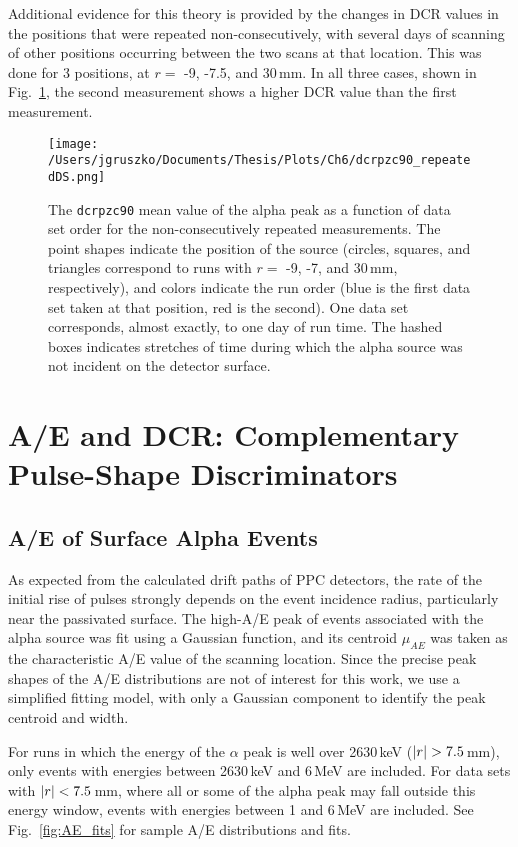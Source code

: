 Additional evidence for this theory is provided by the changes in DCR values in the positions that were repeated non-consecutively, with several days of scanning of other positions occurring between the two scans at that location. This was done for 3 positions, at $r= $  -9, -7.5, and 30\,mm. In all three cases, shown in Fig.~\ref{fig:DCR_repeated}, the second measurement shows a higher DCR value than the first measurement.  

\begin{figure}[t]
 \centering
 \texttt{[image: /Users/jgruszko/Documents/Thesis/Plots/Ch6/dcrpzc90\_repeatedDS.png]}
 \caption[The change in DCR parameter values over time at repeated scan positions] {The {\tt dcrpzc90} mean value of the alpha peak as a function of data set order for the non-consecutively repeated measurements. The point shapes indicate the position of the source (circles, squares, and triangles correspond to runs with $r=$ -9, -7, and 30\,mm, respectively), and colors indicate the run order (blue is the first data set taken at that position, red is the second). One data set corresponds, almost exactly, to one day of run time. The hashed boxes indicates stretches of time during which the alpha source was not incident on the detector surface.} 
 \label{fig:DCR_repeated}
\end{figure}



\section{A/E and DCR: Complementary Pulse-Shape Discriminators} 
\subsection{A/E of Surface Alpha Events}
As expected from the calculated drift paths of PPC detectors, the rate of the initial rise of pulses strongly depends on the event incidence radius, particularly near the passivated surface. The high-A/E peak of events associated with the alpha source was fit using a Gaussian function, and its centroid $\mu_{AE}$ was taken as the characteristic A/E value of the scanning location. Since the precise peak shapes of the A/E distributions are not of interest for this work, we use a simplified fitting model, with only a Gaussian component to identify the peak centroid and width. 

For runs in which the energy of the $\alpha$ peak is well over 2630\,keV ($\abs{r} > 7.5$\,mm), only events with energies between 2630\,keV and 6\,MeV are included. For data sets with $\abs{r} < 7.5$\,mm, where all or some of the alpha peak may fall outside this energy window, events with energies between 1 and 6\,MeV are included. See Fig.~\ref{fig:AE_fits} for sample A/E distributions and fits. 

